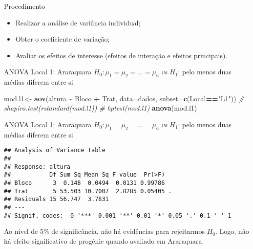 \documentclass[
  ignorenonframetext,
]{beamer}
\newenvironment{Shaded}{\begin{snugshade}}{\end{snugshade}}
\newcommand{\AttributeTok}[1]{\textcolor[rgb]{0.13,0.29,0.53}{#1}}
\newcommand{\CommentTok}[1]{\textcolor[rgb]{0.56,0.35,0.01}{\textit{#1}}}
\newcommand{\FunctionTok}[1]{\textcolor[rgb]{0.13,0.29,0.53}{\textbf{#1}}}
\newcommand{\NormalTok}[1]{#1}
\newcommand{\OtherTok}[1]{\textcolor[rgb]{0.56,0.35,0.01}{#1}}
\newcommand{\SpecialCharTok}[1]{\textcolor[rgb]{0.81,0.36,0.00}{\textbf{#1}}}
\newcommand{\StringTok}[1]{\textcolor[rgb]{0.31,0.60,0.02}{#1}}
\providecommand{\tightlist}{%
  \setlength{\itemsep}{0pt}\setlength{\parskip}{0pt}}
\begin{document}
\begin{frame}{Procedimento}
\protect\hypertarget{procedimento}{}
\begin{itemize}
\tightlist
\item
  Realizar a análise de variância individual;
\item
  Obter o coeficiente de variação;
\item
  Avaliar os efeitos de interesse (efeitos de interação e efeitos
  principais).
\end{itemize}
\end{frame}

\begin{frame}[fragile]{ANOVA Local 1: Araraquara}
\protect\hypertarget{anova-local-1-araraquara}{}
\(H_0: \mu_1 = \mu_2 = \ldots = \mu_6\) \emph{vs} \(H_1\): pelo menos
duas médias diferem entre si

\begin{Shaded}
\begin{Highlighting}[]
\NormalTok{mod.l1}\OtherTok{\textless{}{-}} \FunctionTok{aov}\NormalTok{(altura }\SpecialCharTok{\textasciitilde{}}\NormalTok{ Bloco }\SpecialCharTok{+}\NormalTok{ Trat, }
             \AttributeTok{data=}\NormalTok{dados, }
             \AttributeTok{subset=}\FunctionTok{c}\NormalTok{(Local}\SpecialCharTok{==}\StringTok{"L1"}\NormalTok{))}
\CommentTok{\# shapiro.test(rstandard(mod.l1))}
\CommentTok{\# bptest(mod.l1)}
\FunctionTok{anova}\NormalTok{(mod.l1)}
\end{Highlighting}
\end{Shaded}
\end{frame}

\begin{frame}[fragile]{ANOVA Local 1: Araraquara}
\protect\hypertarget{anova-local-1-araraquara-1}{}
\(H_0: \mu_1 = \mu_2 = \ldots = \mu_6\) \emph{vs} \(H_1\): pelo menos
duas médias diferem entre si

\begin{verbatim}
## Analysis of Variance Table
## 
## Response: altura
##           Df Sum Sq Mean Sq F value  Pr(>F)  
## Bloco      3  0.148  0.0494  0.0131 0.99786  
## Trat       5 53.503 10.7007  2.8285 0.05405 .
## Residuals 15 56.747  3.7831                  
## ---
## Signif. codes:  0 '***' 0.001 '**' 0.01 '*' 0.05 '.' 0.1 ' ' 1
\end{verbatim}

Ao nível de 5\% de significância, não há evidências para rejeitarmos
\(H_0\). Logo, não há efeito significativo de progênie quando avaliado
em Araraquara.
\end{frame}
\end{document}
